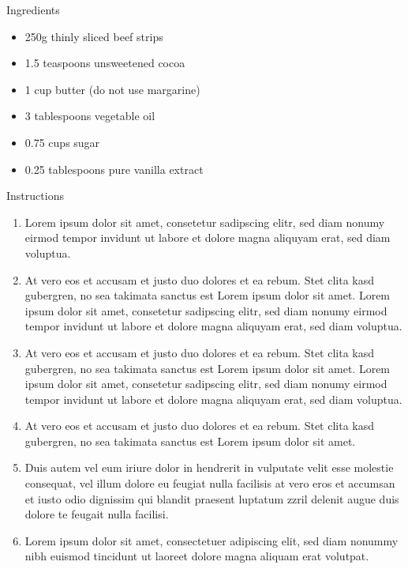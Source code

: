 \documentclass[a4paper]{article}
\newcommand{\ingredient}[1]{
	\item[]{#1}\\
}
\newenvironment{steps}
{
	{\fontsize{22}{26}\selectfont\fontseasons Instructions}
	\begin{enumerate}[leftmargin=0.4cm]
	}
	{
	\end{enumerate}
}
\newenvironment{ingredients}
{
	\vspace{-32.8pt} %
	\begin{tcolorbox}[colback=bgIngredients, colframe=bgIngredients, width=\textwidth, boxsep=4pt, sharp corners, height=14cm, top=15pt]
		{\fontsize{22}{26}\selectfont\fontseasons Ingredients}
		\begin{itemize}[nosep, itemsep=-6pt, leftmargin=1pt]
			\vspace{5.4pt}
			\fontsize{10}{14}
		}
		{
		\end{itemize}
	\end{tcolorbox}
}
\begin{document}
	\begin{multicols}{2} %
		\normalsize
		\raggedright
		\hspace{32pt}
		\begin{minipage}[t]{0.30\textwidth} %
			\begin{ingredients}
				\ingredient{250g thinly sliced beef strips}
				\ingredient{1.5 teaspoons unsweetened cocoa}
				\ingredient{1 cup butter (do not use margarine)}
				\ingredient{3 tablespoons vegetable oil}
				\ingredient{0.75 cups sugar}
				\ingredient{0.25 tablespoons pure vanilla extract}
			\end{ingredients}
		\end{minipage}
		
		\begin{minipage}[t]{0.49\textwidth} %
			\begin{steps}
				\item{Lorem ipsum dolor sit amet, consetetur sadipscing elitr, sed diam nonumy eirmod tempor invidunt ut labore et dolore magna aliquyam erat, sed diam voluptua.}
				\item{At vero eos et accusam et justo duo dolores et ea rebum. Stet clita kasd gubergren, no sea takimata sanctus est Lorem ipsum dolor sit amet. Lorem ipsum dolor sit amet, consetetur sadipscing elitr, sed diam nonumy eirmod tempor invidunt ut labore et dolore magna aliquyam erat, sed diam voluptua.}
				\item{At vero eos et accusam et justo duo dolores et ea rebum. Stet clita kasd gubergren, no sea takimata sanctus est Lorem ipsum dolor sit amet. Lorem ipsum dolor sit amet, consetetur sadipscing elitr, sed diam nonumy eirmod tempor invidunt ut labore et dolore magna aliquyam erat, sed diam voluptua.}
				\item{At vero eos et accusam et justo duo dolores et ea rebum. Stet clita kasd gubergren, no sea takimata sanctus est Lorem ipsum dolor sit amet.}
				\item{Duis autem vel eum iriure dolor in hendrerit in vulputate velit esse molestie consequat, vel illum dolore eu feugiat nulla facilisis at vero eros et accumsan et iusto odio dignissim qui blandit praesent luptatum zzril delenit augue duis dolore te feugait nulla facilisi.}
				\item{Lorem ipsum dolor sit amet, consectetuer adipiscing elit, sed diam nonummy nibh euismod tincidunt ut laoreet dolore magna aliquam erat volutpat.}		
			\end{steps}
		\end{minipage}
	\end{multicols}
\end{document}
